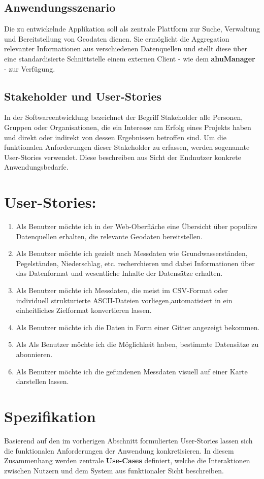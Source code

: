 \documentclass[a4paper,12pt]{scrreprt}
\begin{document}
	\subsection{Anwendungsszenario}
	Die zu entwickelnde Applikation soll als zentrale Plattform zur Suche, Verwaltung und Bereitstellung von Geodaten dienen. Sie ermöglicht die Aggregation relevanter Informationen aus verschiedenen Datenquellen und stellt diese über eine standardisierte Schnittstelle einem externen Client - wie dem \textbf{ahuManager} - zur Verfügung.
	\subsection{Stakeholder und User-Stories}
	In der Softwareentwicklung bezeichnet der Begriff Stakeholder alle Personen, Gruppen oder Organisationen, die ein Interesse am Erfolg eines Projekts haben und direkt oder indirekt von dessen Ergebnissen betroffen sind. Um die funktionalen Anforderungen dieser Stakeholder zu erfassen, werden sogenannte User-Stories verwendet. Diese beschreiben aus Sicht der Endnutzer konkrete Anwendungsbedarfe.
	\section*{\small \textbf{User-Stories:}}
	\begin{enumerate}
		\item Als Benutzer möchte ich in der Web-Oberfläche eine Übersicht über populäre Datenquellen erhalten, die relevante Geodaten bereitstellen.
		\item Als Benutzer möchte ich gezielt nach Messdaten wie Grundwasserständen, Pegelständen, Niederschlag, etc. recherchieren und dabei Informationen über das Datenformat und wesentliche Inhalte der Datensätze erhalten.
		\item Als Benutzer möchte ich Messdaten, die meist im CSV-Format oder individuell strukturierte ASCII-Dateien vorliegen,automatisiert in ein einheitliches Zielformat konvertieren lassen.
		\item Als Benutzer möchte ich die Daten in Form einer Gitter angezeigt bekommen.
		\item Als Als Benutzer möchte ich die Möglichkeit haben, bestimmte Datensätze zu abonnieren.
		\item Als Benutzer möchte ich die gefundenen Messdaten visuell auf einer Karte darstellen lassen.
	\end{enumerate}
	
	\section{Spezifikation}
	Basierend auf den im vorherigen Abschnitt formulierten User-Stories lassen sich die funktionalen Anforderungen der Anwendung konkretisieren. In diesem Zusammenhang werden zentrale \textbf{ Use-Cases} definiert, welche die Interaktionen zwischen Nutzern und dem System aus funktionaler Sicht beschreiben.
\end{document}
